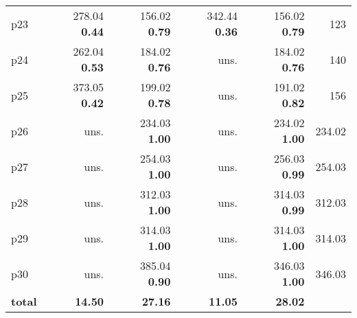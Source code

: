 \begin{tabular}{lrrrrr}
\multicolumn{1}{l|}{p23} & {\footnotesize 278.04} \textbf{0.44} & {\footnotesize 156.02} \textbf{0.79} & {\footnotesize 342.44} \textbf{0.36} & {\footnotesize 156.02} \textbf{0.79} & \multicolumn{1}{|r}{123}\\
\multicolumn{1}{l|}{p24} & {\footnotesize 262.04} \textbf{0.53} & {\footnotesize 184.02} \textbf{0.76} & uns. & {\footnotesize 184.02} \textbf{0.76} & \multicolumn{1}{|r}{140}\\
\multicolumn{1}{l|}{p25} & {\footnotesize 373.05} \textbf{0.42} & {\footnotesize 199.02} \textbf{0.78} & uns. & {\footnotesize 191.02} \textbf{0.82} & \multicolumn{1}{|r}{156}\\
\multicolumn{1}{l|}{p26} & uns. & {\footnotesize 234.03} \textbf{1.00} & uns. & {\footnotesize 234.02} \textbf{1.00} & \multicolumn{1}{|r}{234.02}\\
\multicolumn{1}{l|}{p27} & uns. & {\footnotesize 254.03} \textbf{1.00} & uns. & {\footnotesize 256.03} \textbf{0.99} & \multicolumn{1}{|r}{254.03}\\
\multicolumn{1}{l|}{p28} & uns. & {\footnotesize 312.03} \textbf{1.00} & uns. & {\footnotesize 314.03} \textbf{0.99} & \multicolumn{1}{|r}{312.03}\\
\multicolumn{1}{l|}{p29} & uns. & {\footnotesize 314.03} \textbf{1.00} & uns. & {\footnotesize 314.03} \textbf{1.00} & \multicolumn{1}{|r}{314.03}\\
\multicolumn{1}{l|}{p30} & uns. & {\footnotesize 385.04} \textbf{0.90} & uns. & {\footnotesize 346.03} \textbf{1.00} & \multicolumn{1}{|r}{346.03}\\
\midrule
\textbf{total} & \textbf{14.50} & \textbf{27.16} & \textbf{11.05} & \textbf{28.02} & \\
\bottomrule
\end{tabular}

